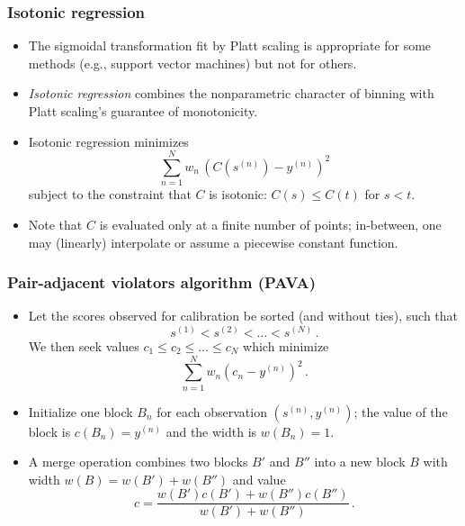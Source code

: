 \documentclass[11pt,compress,t,notes=noshow, xcolor=table]{beamer}
\begin{document}
\begin{frame}[t]
	\frametitle{Isotonic regression}
	
	\begin{itemize}
		\item The sigmoidal transformation fit by Platt scaling is appropriate for some methods (e.g., support vector machines) but not for others. 
		\item \emph{Isotonic regression} combines the nonparametric character of binning with Platt scaling's guarantee of monotonicity.
		\item Isotonic regression minimizes 
		$$
		\sum_{n=1}^N w_n \, (C(s^{(n)}) - y^{(n)})^2 
		$$
		subject to the constraint that $C$ is isotonic: $C(s) \leq C(t)$ for $s <t$. 
		\item 
		Note that $C$ is evaluated only at a finite number of points; in-between, one may (linearly) interpolate or assume a piecewise constant function. 
		
	\end{itemize}
\end{frame}


\begin{frame}[t]
	\frametitle{Pair-adjacent violators algorithm (PAVA)}
	
	\begin{itemize}
		\item Let the scores observed for calibration be sorted (and without ties), such that
		$$
		s^{(1)} < s^{(2)} < \ldots < s^{(N)}\, .
		$$
		We then seek values $c_1 \leq c_2 \leq \ldots \leq c_N$ which minimize
		$$
		\sum_{n=1}^N w_n ( c_n - y^{(n)})^2 \, .
		$$
		\item Initialize one block $B_n$ for each observation $(s^{(n)} , y^{(n)})$; the value of the block is $c(B_n) = y^{(n)}$ and the width is $w(B_n) = 1$.
		
		\item A merge operation combines two blocks $B'$ and $B''$ into a new block $B$ with width $w(B) = w(B') + w(B'')$ and value
		$$
		c = \frac{w(B') c(B') + w(B'') c(B'')}{w(B') + w(B'')} \, .
		$$
		
		
	\end{itemize}
\end{frame}
\end{document}
